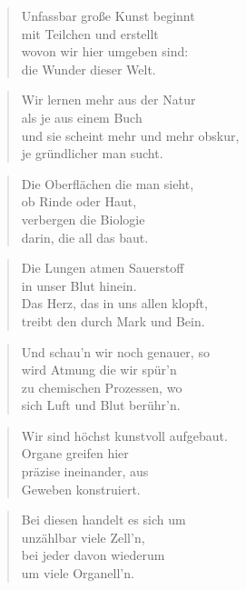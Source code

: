 \documentclass[10pt,a4paper]{article}
\begin{document}
\begin{paracol}{2}
\begin{verse}
Unfassbar große Kunst beginnt \\
mit Teilchen und erstellt \\
wovon wir hier umgeben sind: \\
die Wunder dieser Welt. \\
\end{verse}

\begin{verse}
Wir lernen mehr aus der Natur \\
als je aus einem Buch \\
und sie scheint mehr und mehr obskur, \\
je gründlicher man sucht. \\
\end{verse}

\begin{verse}
Die Oberflächen die man sieht, \\
ob Rinde oder Haut, \\
verbergen die Biologie \\
darin, die all das baut. \\
\end{verse}

\begin{verse}
Die Lungen atmen Sauerstoff \\
in unser Blut hinein. \\
Das Herz, das in uns allen klopft, \\
treibt den durch Mark und Bein. \\
\end{verse}

\begin{verse}
Und schau’n wir noch genauer, so \\
wird Atmung die wir spür’n \\
zu chemischen Prozessen, wo \\
sich Luft und Blut berühr’n. \\
\end{verse}

\begin{verse}
Wir sind höchst kunstvoll aufgebaut. \\
Organe greifen hier \\
präzise ineinander, aus \\
Geweben konstruiert. \\
\end{verse}

\begin{verse}
Bei diesen handelt es sich um \\
unzählbar viele Zell’n, \\
bei jeder davon wiederum \\
um viele Organell’n. \\
\end{verse}


\end{paracol}
\end{document}
